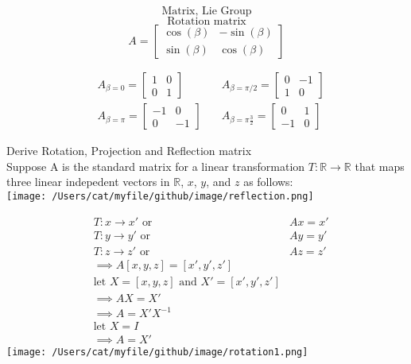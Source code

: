 \documentclass{article}
\begin{document}
\[ \text{Matrix, Lie Group} \]
\[ \text{Rotation matrix} \]
\[
A= \begin{bmatrix}
    \cos(\beta) & -\sin(\beta)\\
    \sin(\beta) & \cos(\beta)
    \end{bmatrix}
\]

\begin{equation}
\begin{aligned}
& A_{\beta=0}= \begin{bmatrix}
    1 & 0\\
    0 & 1 
    \end{bmatrix} \quad
& A_{\beta=\pi/2}= \begin{bmatrix}
    0 & -1\\
    1 & 0 
    \end{bmatrix}\\
& A_{\beta=\pi}= \begin{bmatrix}
    -1 & 0\\
    0 & -1 
    \end{bmatrix}\quad
& A_{\beta=\pi\frac{3}{2}}= \begin{bmatrix}
    0 & 1\\
    -1 & 0 
    \end{bmatrix} \nonumber
\end{aligned}
\end{equation}

\noindent Derive Rotation, Projection and Reflection matrix\\

\noindent Suppose A is the standard matrix for a linear transformation $T: \mathbb{R} \rightarrow \mathbb{R}$
that maps three linear indepedent vectors in $\mathbb{R}$, $x$, $y$, and $z$ as follows:\\
\texttt{[image: /Users/cat/myfile/github/image/reflection.png]}

\begin{equation}
\begin{aligned}
    & T:x \rightarrow x' \text{ or } & Ax = x'\\
    & T:y \rightarrow y' \text{ or } & Ay = y'\\
    & T:z \rightarrow z' \text{ or } & Az = z'\\
    & \implies A[x, y, z] = [x', y', z']\\
    & \text{let } X = [x, y, z] \text{ and } X' = [x', y', z'] \\
    & \implies AX = X' \\
    & \implies A = X'X^{-1} \\
    & \text{let } X = I \\
    & \implies A = X'
\end{aligned}
\end{equation}
\texttt{[image: /Users/cat/myfile/github/image/rotation1.png]}
\end{document}
